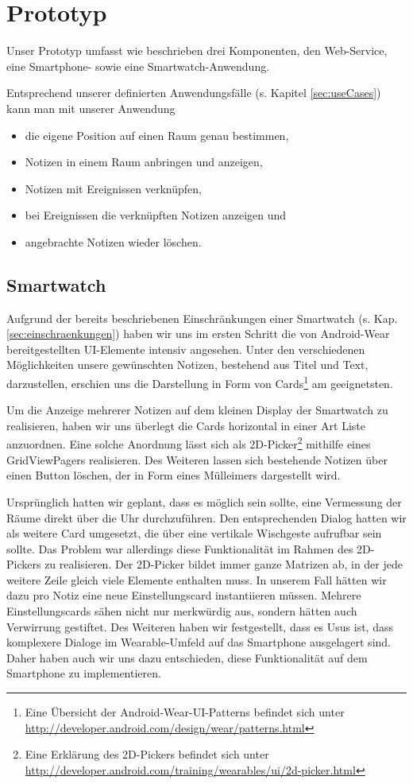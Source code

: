 \section{Prototyp}
\label{sec:prototyp}
Unser Prototyp umfasst wie beschrieben drei Komponenten, den Web-Service, eine Smartphone- sowie eine Smartwatch-Anwendung. 

Entsprechend unserer definierten Anwendungsfälle (s. Kapitel \ref{sec:useCases}) kann man mit unserer Anwendung
\begin{itemize}
\item{die eigene Position auf einen Raum genau bestimmen,}
\item{Notizen in einem Raum anbringen und anzeigen,}
\item{Notizen mit Ereignissen verknüpfen,}
\item{bei Ereignissen die verknüpften Notizen anzeigen und}
\item{angebrachte Notizen wieder löschen.} 
\end{itemize}


\subsection{Smartwatch}
Aufgrund der bereits beschriebenen Einschränkungen einer Smartwatch (s. Kap. \ref{sec:einschraenkungen}) haben wir uns im ersten Schritt die von Android-Wear bereitgestellten UI-Elemente intensiv angesehen. Unter den verschiedenen Möglichkeiten unsere gewünschten Notizen, bestehend aus Titel und Text, darzustellen, erschien uns die Darstellung in Form von Cards\footnote{Eine Übersicht der Android-Wear-UI-Patterns befindet sich unter \url{http://developer.android.com/design/wear/patterns.html}} am geeignetsten.

Um die Anzeige mehrerer Notizen auf dem kleinen Display der Smartwatch zu realisieren, haben wir uns überlegt die Cards horizontal in einer Art Liste anzuordnen. Eine solche Anordnung lässt sich als 2D-Picker\footnote{Eine Erklärung des 2D-Pickers befindet sich unter  \url{http://developer.android.com/training/wearables/ui/2d-picker.html}} mithilfe eines GridViewPagers realisieren. Des Weiteren lassen sich bestehende Notizen über einen Button löschen, der in Form eines Mülleimers dargestellt wird. 

Ursprünglich hatten wir geplant, dass es möglich sein sollte, eine Vermessung der Räume direkt über die Uhr durchzuführen. Den entsprechenden Dialog hatten wir als weitere Card umgesetzt, die über eine vertikale Wischgeste aufrufbar sein sollte. Das Problem war allerdings diese Funktionalität im Rahmen des 2D-Pickers
zu realisieren. Der 2D-Picker bildet immer ganze Matrizen ab, in der jede weitere Zeile gleich viele Elemente enthalten muss. In unserem Fall hätten wir dazu pro Notiz eine neue Einstellungscard instantiieren müssen. Mehrere Einstellungscards sähen nicht nur merkwürdig aus, sondern hätten auch Verwirrung gestiftet. Des Weiteren haben wir festgestellt, dass es Usus ist, dass komplexere Dialoge im Wearable-Umfeld auf das Smartphone ausgelagert sind. Daher haben auch wir uns dazu entschieden, diese Funktionalität auf dem Smartphone zu implementieren.


